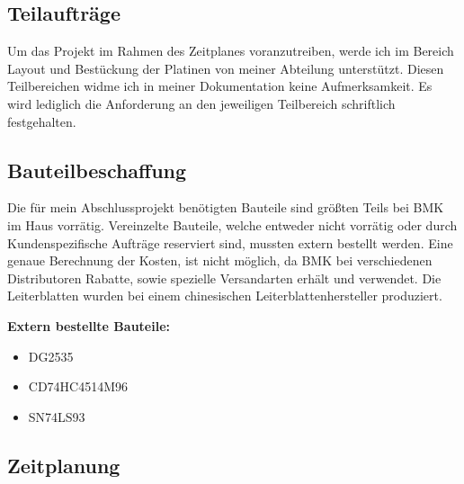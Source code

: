 \subsection{Teilaufträge}
Um das Projekt im Rahmen des Zeitplanes voranzutreiben, werde ich im Bereich Layout und Bestückung der Platinen von meiner Abteilung unterstützt. Diesen Teilbereichen widme ich in meiner Dokumentation keine Aufmerksamkeit. Es wird lediglich die Anforderung an den jeweiligen Teilbereich schriftlich festgehalten. 

\subsection{Bauteilbeschaffung}
Die für mein Abschlussprojekt benötigten Bauteile sind größten Teils bei BMK im Haus vorrätig. Vereinzelte Bauteile, welche entweder nicht vorrätig oder durch \glqq Kundenspezifische Aufträge \grqq reserviert sind, mussten extern bestellt werden. Eine genaue Berechnung der Kosten, ist nicht möglich, da BMK bei verschiedenen Distributoren Rabatte, sowie spezielle Versandarten erhält und verwendet. Die Leiterblatten wurden bei einem chinesischen Leiterblattenhersteller produziert. 

\newpage

\textbf{Extern bestellte Bauteile:} 

\begin{itemize}
	\item{DG2535}
	
	\item{CD74HC4514M96}
	
	\item{SN74LS93}
\end{itemize}

\renewcommand{\arraystretch}{2}
\subsection{Zeitplanung}


